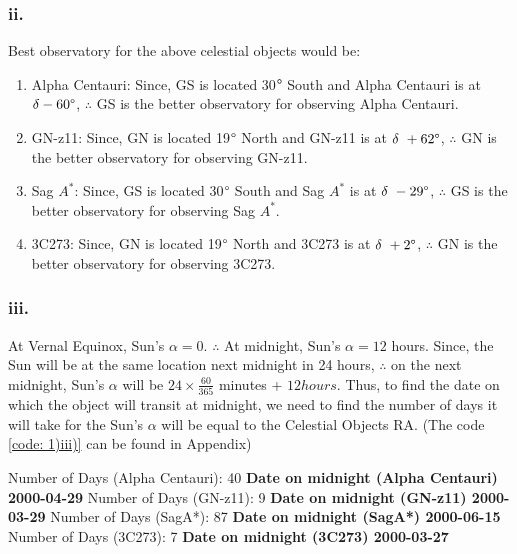 \documentclass{article}
\begin{document}
        \subsubsection*{ii.}
        Best observatory for the above celestial objects would be:
            \begin{enumerate}
                \item Alpha Centauri: Since, GS is located 30$\degree$ South and Alpha Centauri is at $\delta -60\degree$, $\therefore$ GS is the better observatory for observing Alpha Centauri.
                \item GN-z11: Since, GN is located 19$\degree$ North and GN-z11 is at $\delta ~ +62\degree$, $\therefore$ GN is the better observatory for observing GN-z11.
                \item Sag $A^{*}$: Since, GS is located 30$\degree$ South and Sag $A^{*}$ is at $\delta ~ -29\degree$, $\therefore$ GS is the better observatory for observing Sag $A^{*}$.
                \item 3C273: Since, GN is located 19$\degree$ North and 3C273 is at $\delta ~ +2\degree$, $\therefore$ GN is the better observatory for observing 3C273.
            \end{enumerate}
            
        \subsubsection*{iii.}
            At Vernal Equinox, Sun's $\alpha = 0$. $\therefore$ At midnight, Sun's $\alpha = 12$ hours.
            Since, the Sun will be at the same location next midnight in 24 hours, $\therefore$ on the next midnight, Sun's $\alpha$ will be $24\times \frac{60}{365}$ minutes + $12 hours$.\newline
            Thus, to find the date on which the object will transit at midnight, we need to find the number of days it will take for the Sun's $\alpha$ will be equal to the Celestial Objects RA. (The code \ref{code: 1)iii)} can be found in Appendix)\newline
            
            Number of Days (Alpha Centauri):  40\newline
            \textbf{Date on midnight (Alpha Centauri) 2000-04-29} \newline
            Number of Days (GN-z11):  9\newline
            \textbf{Date on midnight (GN-z11) 2000-03-29} \newline
            Number of Days (SagA*):  87\newline
            \textbf{Date on midnight (SagA*) 2000-06-15} \newline
            Number of Days (3C273):  7\newline
            \textbf{Date on midnight (3C273) 2000-03-27}\newline
            
\end{document}

